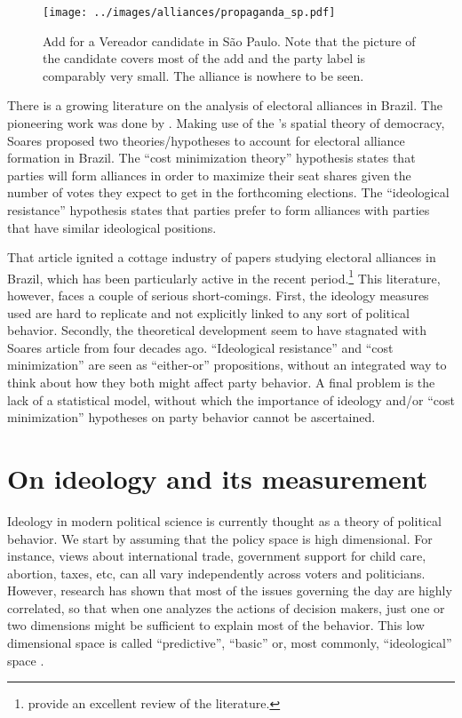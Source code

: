 \begin{figure}
  \centering
  \texttt{[image: ../images/alliances/propaganda\_sp.pdf]}
  \caption{Add for a Vereador candidate in São Paulo. Note that the picture of the candidate covers most of the add and the party label is comparably very small. The alliance is nowhere to be seen.}
  \label{fig:add_sp}
\end{figure}


There is a growing literature on the analysis of electoral alliances in Brazil. The pioneering work was done by  \citet{soares:1964}. Making use of the \citet{downs:1957}'s spatial theory of democracy, Soares proposed two theories/hypotheses to account for electoral alliance formation in Brazil.  The  ``cost minimization theory'' hypothesis  states that parties will form alliances 
in order to maximize their seat shares given the number of votes they expect to get in the forthcoming elections. The ``ideological resistance'' hypothesis states that parties prefer to form alliances with parties that have similar ideological positions. 

That article ignited a cottage industry of papers studying electoral alliances in Brazil, which has been particularly active in the recent period.\footnote{\citet{miguel:2007} provide an excellent review of the literature.} This literature, however, faces a couple of serious short-comings. First, the ideology measures used are hard to replicate and not explicitly linked to any sort of political behavior. Secondly, the theoretical development seem to have stagnated with Soares article from four decades ago. ``Ideological resistance'' and ``cost minimization'' are seen as ``either-or'' propositions, without an integrated way to think about how they both might affect party behavior. A final problem is the lack of a statistical model, without which the  importance of ideology and/or  ``cost minimization'' hypotheses on party behavior cannot be ascertained. 






\section{On   ideology and its measurement}

Ideology in modern political science is currently thought as a theory of political behavior. We  start by assuming that the policy space is high dimensional. For instance, views about international trade, government support for child care, abortion, taxes, etc, can all vary independently across voters and politicians. However, research  has shown that most of the issues governing the day are highly correlated, so that when one analyzes the actions of decision makers, just one or two dimensions might be sufficient to explain most of the behavior. This low dimensional space is called ``predictive'', ``basic'' \citep[p.13-14]{poole:2005} or, most commonly, ``ideological'' space \citep{hinich:1994}.   

